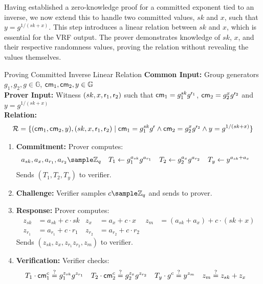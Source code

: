 Having established a zero-knowledge proof for a committed exponent tied to an inverse, we now extend this to handle two committed values, $sk$ and $x$, such that $y = g^{1/(sk + x)}$. This step introduces a linear relation between $sk$ and $x$, which is essential for the VRF output. The prover demonstrates knowledge of $sk$, $x$, and their respective randomness values, proving the relation without revealing the values themselves.


\begin{protocol}{Proving Committed Inverse Linear Relation}{}\label{pok-committed-inverse-linear-relation}
\textbf{Common Input:} Group generators $g_1, g_2, g \in \mathbb{G}$, $\mathsf{cm}_1, \mathsf{cm}_2, y \in \mathbb{G}$ \\
\textbf{Prover Input:} Witness $(sk, x, \mathsf{r}_1, \mathsf{r}_2)$ such that $\mathsf{cm}_1 = g_1^{sk} g^{\mathsf{r}_1}$, $\mathsf{cm}_2 = g_2^{x}g^{\mathsf{r}_2}$ and $ y = g^{1/(sk + x)}$ \\
\textbf{Relation: }
\[
\mathcal{R} = \{(\mathsf{cm}_1,\mathsf{cm}_2, y), (sk, x, \mathsf{r}_1, \mathsf{r}_2) \mid \mathsf{cm}_1 = g_1^{sk} g^{\mathsf{r}} \wedge \mathsf{cm}_2 = g_2^{x}g^{\mathsf{r}_2} \wedge y = g^{1/(sk + x)}\}
\]
\begin{enumerate}
    \item \textbf{Commitment:} Prover computes:
    \begin{align*}
        a_{sk}, a_x, a_{r_1}, a_{r_2} &\sample \Z_q & T_1 &\gets g_1^{a_{sk}} g^{a_{r_1}} & T_2 &\gets g_2^{a_x} g^{a_{r_2}} & T_y &\gets y^{a_{sk} + a_x}
    \end{align*}
    Sends $(T_1, T_2, T_y)$ to verifier.
    
    \item \textbf{Challenge:} Verifier samples $c \sample \mathbb{Z}_q$ and sends to prover.
    
    \item \textbf{Response:} Prover computes:
     \begin{align*}
        z_{sk} &= a_{sk} + c \cdot sk & z_x &= a_x + c \cdot x &  z_m &= (a_{sk} + a_x) + c \cdot (sk + x)\\   
        z_{r_1} &= a_{r_1} + c \cdot r_1 & z_{r_2} &= a_{r_2} + c \cdot r_2
    \end{align*}
    Sends $(z_{sk}, z_x, z_{r_1} z_{r_2}, z_m)$ to verifier.
    
    \item \textbf{Verification:} Verifier checks:
    \begin{align*}
        T_1 \cdot \mathsf{cm}_1^c &\stackrel{?}{=} g_1^{z_{sk}}g^{z_{r_1}} 
        &
        T_2 \cdot \mathsf{cm}_2^c &\stackrel{?}{=}  g_2^{z_x} g^{z_{r_2}} 
        &
        T_y \cdot g^c &\stackrel{?}{=} y^{z_m} &
        z_m &\stackrel{?}{=} z_{sk} + z_x
    \end{align*}
\end{enumerate}
\end{protocol}







